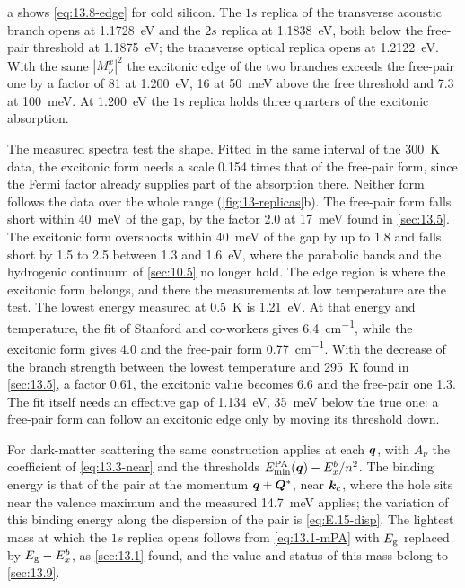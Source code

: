 a shows \cref{eq:13.8-edge} for cold silicon. The $1s$ replica of the transverse acoustic branch opens at \SI{1.1728}{eV} and the $2s$ replica at \SI{1.1838}{eV}, both below the free-pair threshold at \SI{1.1875}{eV}; the transverse optical replica opens at \SI{1.2122}{eV}. With the same $|M^x_\nu|^2$ the excitonic edge of the two branches exceeds the free-pair one by a factor of 81 at \SI{1.200}{eV}, 16 at \SI{50}{meV} above the free threshold and 7.3 at \SI{100}{meV}. At \SI{1.200}{eV} the $1s$ replica holds three quarters of the excitonic absorption.

The measured spectra test the shape. Fitted in the same interval of the \SI{300}{K} data, the excitonic form needs a scale 0.154 times that of the free-pair form, since the Fermi factor already supplies part of the absorption there. Neither form follows the data over the whole range (\cref{fig:13-replicas}b). The free-pair form falls short within \SI{40}{meV} of the gap, by the factor 2.0 at \SI{17}{meV} found in \cref{sec:13.5}. The excitonic form overshoots within \SI{40}{meV} of the gap by up to 1.8 and falls short by 1.5 to 2.5 between 1.3 and \SI{1.6}{eV}, where the parabolic bands and the hydrogenic continuum of \cref{sec:10.5} no longer hold. The edge region is where the excitonic form belongs, and there the measurements at low temperature are the test. The lowest energy measured at \SI{0.5}{K} is \SI{1.21}{eV}. At that energy and temperature, the fit of Stanford and co-workers gives \SI{6.4}{cm^{-1}}, while the excitonic form gives 4.0 and the free-pair form \SI{0.77}{cm^{-1}}. With the decrease of the branch strength between the lowest temperature and \SI{295}{K} found in \cref{sec:13.5}, a factor 0.61, the excitonic value becomes 6.6 and the free-pair one 1.3. The fit itself needs an effective gap of \SI{1.134}{eV}, \SI{35}{meV} below the true one: a free-pair form can follow an excitonic edge only by moving its threshold down.

For dark-matter scattering the same construction applies at each $\bm{q}$, with $A_\nu$ the coefficient of \cref{eq:13.3-near} and the thresholds $E_{\mathrm{min}}^{\mathrm{PA}}(\bm{q}) - E_x^b/n^2$. The binding energy is that of the pair at the momentum $\bm{q}+\bm{Q}^*$, near $\bm{k}_{\mathrm{c}}$, where the hole sits near the valence maximum and the measured \SI{14.7}{meV} applies; the variation of this binding energy along the dispersion of the pair is \cref{eq:E.15-disp}. The lightest mass at which the $1s$ replica opens follows from \cref{eq:13.1-mPA} with $E_{\mathrm{g}}$ replaced by $E_{\mathrm{g}} - E_x^b$, as \cref{sec:13.1} found, and the value and status of this mass belong to \cref{sec:13.9}.

